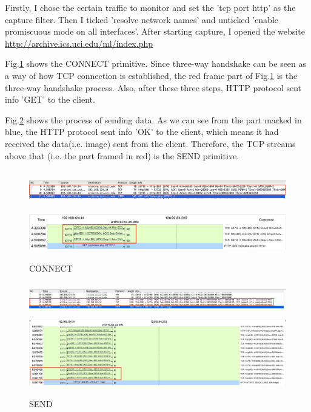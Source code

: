 \documentclass[11pt]{article} %
\newcommand{\reffig}[1]{Fig.\ref{#1}}
\begin{document}
 Firstly, I chose the certain traffic to monitor and set the 'tcp port http' as the capture filter. Then I ticked 'resolve network names' and unticked 'enable promiscuous mode on all interfaces'.  After starting capture, I opened the website \href{http://archive.ics.uci.edu/ml/index.php}{http://archive.ics.uci.edu/ml/index.php}
  
\reffig{connect} shows the CONNECT primitive. Since three-way handshake can be seen as a way of how TCP connection is established,  the red frame part of \reffig{connect} is the three-way handshake process. Also, after these three steps, HTTP protocol sent info 'GET' to the client.

\reffig{send} shows the process of sending data. As we can see from the part marked in blue, the HTTP protocol sent info 'OK' to the client, which means it had received the data(i.e. image) sent from the client. Therefore, the TCP streams above that (i.e. the part framed in red) is the SEND primitive.

  \begin{figure}[htbp]
 \centering
\includegraphics[height=1.7cm,width=19cm]{img/connect.png}
\includegraphics[height=1.7cm,width=13cm]{img/CONNECT_1.png}
\caption{CONNECT}\label{connect}
 \end{figure}
   \begin{figure}[htbp]
 \centering
\includegraphics[height=1.4cm,width=19cm]{img/send.png}
\includegraphics[height=3cm,width=13cm]{img/SEND_1.png}
\caption{SEND}\label{send}
 \end{figure}
\end{document}
